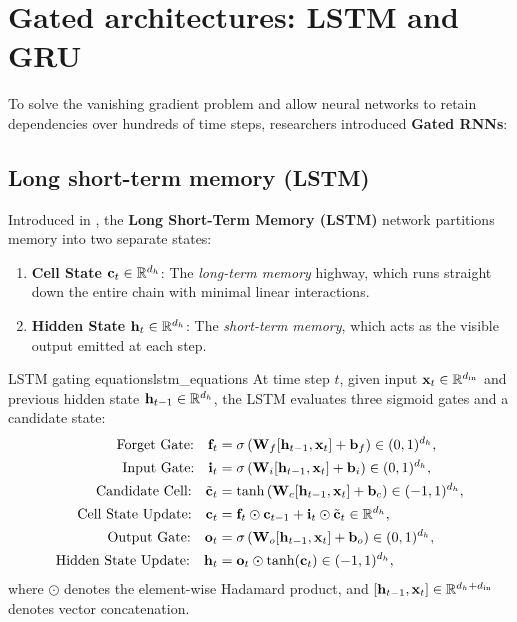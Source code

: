 \documentclass[../../main.tex]{subfiles}
\begin{document}
\clearpage
\section{Gated architectures: LSTM and GRU}
\label{sec:gated_architectures}

To solve the vanishing gradient problem and allow neural networks to retain dependencies over hundreds of time steps, researchers introduced \textbf{Gated RNNs}:

\subsection{Long short-term memory (LSTM)}
Introduced in \cite{hochreiter1997}, the \textbf{Long Short-Term Memory (LSTM)} network partitions memory into two separate states:
\begin{enumerate}
    \item \textbf{Cell State $\mathbf{c}_t \in \mathbb{R}^{d_h}$}: The \emph{long-term memory} highway, which runs straight down the entire chain with minimal linear interactions.
    \item \textbf{Hidden State $\mathbf{h}_t \in \mathbb{R}^{d_h}$}: The \emph{short-term memory}, which acts as the visible output emitted at each step.
\end{enumerate}

\begin{definition}{LSTM gating equations}{lstm_equations}
At time step $t$, given input $\mathbf{x}_t \in \mathbb{R}^{d_{\text{in}}}$ and previous hidden state $\mathbf{h}_{t-1} \in \mathbb{R}^{d_h}$, the LSTM evaluates three sigmoid gates and a candidate state:
\begin{align}
\text{Forget Gate:} \quad \mathbf{f}_t &= \sigma\left( \mathbf{W}_f [\mathbf{h}_{t-1}, \mathbf{x}_t] + \mathbf{b}_f \right) \in (0, 1)^{d_h}, \label{eq:lstm_forget} \\
\text{Input Gate:} \quad \mathbf{i}_t &= \sigma\left( \mathbf{W}_i [\mathbf{h}_{t-1}, \mathbf{x}_t] + \mathbf{b}_i \right) \in (0, 1)^{d_h}, \label{eq:lstm_input} \\
\text{Candidate Cell:} \quad \tilde{\mathbf{c}}_t &= \tanh\left( \mathbf{W}_c [\mathbf{h}_{t-1}, \mathbf{x}_t] + \mathbf{b}_c \right) \in (-1, 1)^{d_h}, \label{eq:lstm_candidate} \\
\text{Cell State Update:} \quad \mathbf{c}_t &= \mathbf{f}_t \odot \mathbf{c}_{t-1} + \mathbf{i}_t \odot \tilde{\mathbf{c}}_t \in \mathbb{R}^{d_h}, \label{eq:lstm_highway} \\
\text{Output Gate:} \quad \mathbf{o}_t &= \sigma\left( \mathbf{W}_o [\mathbf{h}_{t-1}, \mathbf{x}_t] + \mathbf{b}_o \right) \in (0, 1)^{d_h}, \label{eq:lstm_output} \\
\text{Hidden State Update:} \quad \mathbf{h}_t &= \mathbf{o}_t \odot \tanh(\mathbf{c}_t) \in (-1, 1)^{d_h}, \label{eq:lstm_hidden}
\end{align}
where $\odot$ denotes the element-wise Hadamard product, and $[\mathbf{h}_{t-1}, \mathbf{x}_t] \in \mathbb{R}^{d_h + d_{\text{in}}}$ denotes vector concatenation.
\end{definition}
\end{document}
